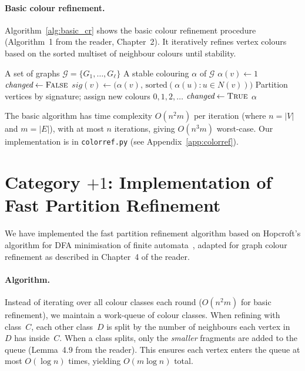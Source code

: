 \documentclass[twoside]{article}
\begin{document}
\paragraph{Basic colour refinement.}
Algorithm~\ref{alg:basic_cr} shows the basic colour refinement procedure (Algorithm~1 from the reader, Chapter~2). It iteratively refines vertex colours based on the sorted multiset of neighbour colours until stability.

\begin{algorithm}[H]
\caption{Basic Colour Refinement}\label{alg:basic_cr}
\begin{algorithmic}[1]
\Require A set of graphs $\mathcal{G} = \{G_1, \ldots, G_\ell\}$
\Ensure A stable colouring $\alpha$ of $\mathcal{G}$
    \State $\alpha(v) \gets 1$ 
\EndFor
\Repeat
    \State $\textit{changed} \gets \textsc{False}$
        \State $\textit{sig}(v) \gets \bigl(\alpha(v),\, \text{sorted}(\alpha(u) : u \in N(v))\bigr)$
    \EndFor
    \State Partition vertices by signature; assign new colours $0, 1, 2, \ldots$
        \State $\textit{changed} \gets \textsc{True}$
    \EndIf
{}
\State \Return $\alpha$
\end{algorithmic}
\end{algorithm}

The basic algorithm has time complexity $O(n^2 m)$ per iteration (where $n = |V|$ and $m = |E|$), with at most $n$ iterations, giving $O(n^3 m)$ worst-case. Our implementation is in \texttt{colorref.py} (see Appendix~\ref{app:colorref}).


\vspace{-1ex}
\section{Category $+1$: Implementation of Fast Partition Refinement}

We have implemented the fast partition refinement algorithm based on Hopcroft's algorithm for DFA minimisation of finite automata~\cite{Hop1971}, adapted for graph colour refinement as described in Chapter~4 of the reader.

\paragraph{Algorithm.}
Instead of iterating over all colour classes each round ($O(n^2 m)$ for basic refinement), we maintain a work-queue of colour classes. When refining with class~$C$, each other class~$D$ is split by the number of neighbours each vertex in~$D$ has inside~$C$. When a class splits, only the \emph{smaller} fragments are added to the queue (Lemma~4.9 from the reader). This ensures each vertex enters the queue at most $O(\log n)$ times, yielding $O(m \log n)$ total.
\end{document}
